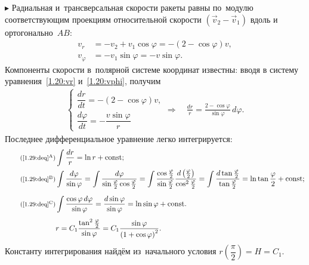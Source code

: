 \documentclass{weekly}
\begin{document}
$\blacktriangleright$ Радиальная и~трансверсальная скорости
ракеты равны по~модулю соответствующим проекциям относительной
скорости $(\vec v_2 - \vec v_1)$ вдоль и ортогонально~$AB$:
\begin{align}
    v_r &= -v_2 + v_1 \cos\varphi = -(2 - \cos\varphi)v,
        \label{1.29:vr}\\
    v_\varphi &= -v_1 \sin\varphi = -v \sin\varphi. \label{1.29:vphi}
\end{align}
Компоненты скорости в~полярной системе координат известны:
вводя в систему уравнения~\eqref{1.20:vr} и~\eqref{1.20:vphi},
получим
\begin{gather}
\begin{cases}
    \dfrac{dr}{dt} = -(2 - \cos\varphi) v, \\[3mm]
    \dfrac{d\varphi}{dt} = -\dfrac{v \sin\varphi}{r}
\end{cases} \Longrightarrow \quad
    \frac{dr}{r} = \frac{2-\cos\varphi}{\sin\varphi}\,d\varphi.
        \label{1.29:deq}
\end{gather}
Последнее дифференциальное уравнение легко интегрируется:
\begin{align}
\tag*{\footnotesize(\ref{1.29:deq}$^\text{A}$)}
    &\int \frac{dr}{r} = \ln r + \const; \\
\tag*{\footnotesize(\ref{1.29:deq}$^\text{B}$)}
    &\int \frac{d\varphi}{\sin\varphi}
    = \int \frac{d\varphi}{\sin\frac{\varphi}{2}\cos\frac{\varphi}{2}}
    = \int \frac{\cos\frac{\varphi}{2}}{\sin\frac{\varphi}{2}}
    \frac{d\left(\frac{\varphi}{2}\right)}{\cos^2\frac{\varphi}{2}}
    = \int \frac{d\tan\frac{\varphi}{2}}{\tan\frac{\varphi}{2}}
    = \ln\tan\frac{\varphi}{2} + \const; \\[2mm]
\tag*{\footnotesize(\ref{1.29:deq}$^\text{C}$)}
    &\int \frac{\cos\varphi\,d\varphi}{\sin\varphi}
    = \frac{d\sin\varphi}{\sin\varphi} = \ln\sin\varphi + \const.
        \\[1ex]
    &r = C_1 \frac{\tan^2\frac{\varphi}{2}}{\sin\varphi}
    = C_1 \frac{\sin\varphi}{\left( 1 + \cos\varphi \right)^2}.
        \label{1.29:r}
\end{align}
Константу интегрирования найдём из~начального условия
$r\!\left(\dfrac{\pi}{2}\right) = H = C_1$.
\end{document}
